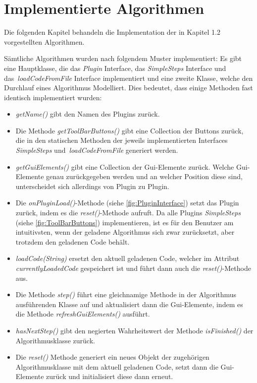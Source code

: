 \section{Implementierte Algorithmen}
Die folgenden Kapitel behandeln die Implementation der in Kapitel 1.2 vorgestellten
Algorithmen.

Sämtliche Algorithmen wurden nach folgendem Muster implementiert:
Es gibt eine Hauptklasse, die das \textit{Plugin} Interface, das 
\textit{SimpleSteps} Interface und das \textit{loadCodeFromFile} Interface 
implementiert und eine zweite Klasse, welche den Durchlauf eines Algorithmus
Modelliert. Dies bedeutet, dass einige Methoden fast identisch implementiert wurden:

\begin{itemize}
  \item \textit{getName()} gibt den Namen des Plugins zurück.

  \item Die Methode \textit{getToolBarButtons()} gibt eine Collection der Buttons zurück,
    die in den statischen Methoden der jeweils implementierten Interfaces 
    \textit{SimpleSteps} und \textit{loadCodeFromFile} generiert werden.

  \item \textit{getGuiElements()} gibt eine Collection der Gui-Elemente zurück.
    Welche Gui-Elemente genau zurückgegeben werden und an welcher Position diese
    sind, unterscheidet sich allerdings von Plugin zu Plugin.

  \item Die \textit{onPluginLoad()}-Methode (siehe \cref{fig:PluginInterface}) 
    setzt das Plugin zurück, indem es die \textit{reset()}-Methode aufruft.
    Da alle Plugins \textit{SimpleSteps} (siehe \cref{fig:ToolBarButtons}) implementieren,
    ist es für den Benutzer am intuitivsten, wenn der geladene Algorithmus sich zwar
    zurücksetzt, aber trotzdem den geladenen Code behält.

  \item \textit{loadCode(String)} ersetzt den aktuell geladenen Code, welcher im Attribut
    \textit{currentlyLoadedCode} gespeichert ist und führt dann auch die 
    \textit{reset()}-Methode aus.

  \item Die Methode \textit{step()} führt eine gleichnamige Methode in der
    Algorithmus ausführenden Klasse auf und aktualisiert dann die Gui-Elemente, 
    indem es die Methode \textit{refreshGuiElements()} ausführt.

  \item \textit{hasNextStep()} gibt den negierten Wahrheitswert der Methode 
    \textit{isFinished()} der Algorithmusklasse zurück.

  \item Die \textit{reset()} Methode generiert ein neues Objekt der zugehörigen
    Algorithmusklasse mit dem aktuell geladenen Code, setzt dann die 
    Gui-Elemente zurück und initialisiert diese dann erneut.
\end{itemize}


